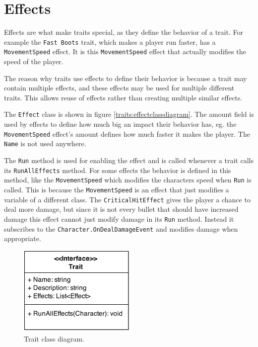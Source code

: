 \section{Effects}
\label{sec:modules:effects}

Effects are what make traits special, as they define the behavior of a trait.
For example the \texttt{Fast Boots} trait, which makes a player run faster, has a \texttt{MovementSpeed} effect.
It is this \texttt{MovementSpeed} effect that actually modifies the speed of the player.

The reason why traits use effects to define their behavior is because a trait may contain multiple effects, and these effects may be used for multiple different traits.
This allows reuse of effects rather than creating multiple similar effects.

The \texttt{Effect} class is shown in figure \ref{traits:effectclassdiagram}.
The amount field is used by effects to define how much big an impact their behavior has, eg. the \texttt{MovementSpeed} effect's amount defines how much faster it makes the player.
The \texttt{Name} is not used anywhere.

The \texttt{Run} method is used for enabling the effect and is called whenever a trait calls its \texttt{RunAllEffects} method.
For some effects the behavior is defined in this method, like the \texttt{MovementSpeed} which modifies the characters speed when \texttt{Run} is called.
This is because the \texttt{MovementSpeed} is an effect that just modifies a variable of a different class.
The \texttt{CriticalHitEffect} gives the player a chance to deal more damage, but since it is not every bullet that should have increased damage this effect cannot just modify damage in its \texttt{Run} method.
Instead it subscribes to the \texttt{Character.OnDealDamageEvent} and modifies damage when appropriate.

\begin{figure}
\centering
\includegraphics[width=0.5\textwidth]{figures/traits/TraitClassDiagram.png}
\caption{Trait class diagram.}
\label{traits:traitclassdiagram}
\end{figure}


